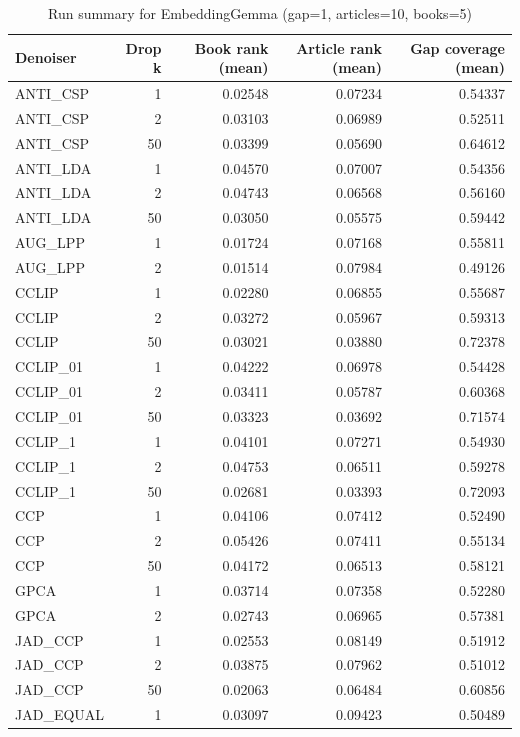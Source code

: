 \begin{table}
\caption{Run summary for EmbeddingGemma (gap=1, articles=10, books=5)}
\label{tab:summary_gap1_embeddinggemma_a10_b5}
\begin{tabular}{lrrrr}
\toprule
Denoiser & Drop k & Book rank (mean) & Article rank (mean) & Gap coverage (mean) \\
\midrule
ANTI\_CSP & 1 & 0.02548 & 0.07234 & 0.54337 \\
ANTI\_CSP & 2 & 0.03103 & 0.06989 & 0.52511 \\
ANTI\_CSP & 50 & 0.03399 & 0.05690 & 0.64612 \\
\hline
ANTI\_LDA & 1 & 0.04570 & 0.07007 & 0.54356 \\
ANTI\_LDA & 2 & 0.04743 & 0.06568 & 0.56160 \\
ANTI\_LDA & 50 & 0.03050 & 0.05575 & 0.59442 \\
\hline
AUG\_LPP & 1 & 0.01724 & 0.07168 & 0.55811 \\
AUG\_LPP & 2 & 0.01514 & 0.07984 & 0.49126 \\
\hline
CCLIP & 1 & 0.02280 & 0.06855 & 0.55687 \\
CCLIP & 2 & 0.03272 & 0.05967 & 0.59313 \\
CCLIP & 50 & 0.03021 & 0.03880 & 0.72378 \\
\hline
CCLIP\_01 & 1 & 0.04222 & 0.06978 & 0.54428 \\
CCLIP\_01 & 2 & 0.03411 & 0.05787 & 0.60368 \\
CCLIP\_01 & 50 & 0.03323 & 0.03692 & 0.71574 \\
\hline
CCLIP\_1 & 1 & 0.04101 & 0.07271 & 0.54930 \\
CCLIP\_1 & 2 & 0.04753 & 0.06511 & 0.59278 \\
CCLIP\_1 & 50 & 0.02681 & 0.03393 & 0.72093 \\
\hline
CCP & 1 & 0.04106 & 0.07412 & 0.52490 \\
CCP & 2 & 0.05426 & 0.07411 & 0.55134 \\
CCP & 50 & 0.04172 & 0.06513 & 0.58121 \\
\hline
GPCA & 1 & 0.03714 & 0.07358 & 0.52280 \\
GPCA & 2 & 0.02743 & 0.06965 & 0.57381 \\
\hline
JAD\_CCP & 1 & 0.02553 & 0.08149 & 0.51912 \\
JAD\_CCP & 2 & 0.03875 & 0.07962 & 0.51012 \\
JAD\_CCP & 50 & 0.02063 & 0.06484 & 0.60856 \\
\hline
JAD\_EQUAL & 1 & 0.03097 & 0.09423 & 0.50489 \\

\end{tabular}
\end{table}
